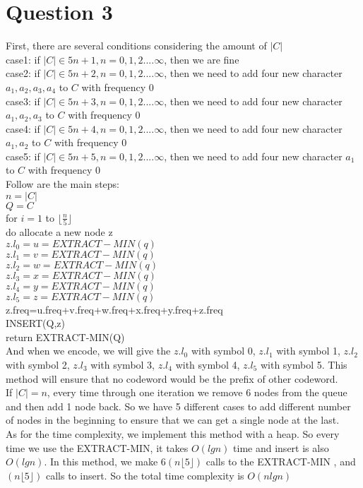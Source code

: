 \documentclass[paper=a4, fontsize=11pt]{scrartcl} %
\numberwithin{equation}{section} %
\numberwithin{figure}{section} %
\numberwithin{table}{section} %
\begin{document}
\section{\textbf{Question 3}}
First, there are several conditions considering the amount of $|C|$\\
case1: if $|C|\in{5n+1},n=0,1,2....\infty$, then we are fine\\
case2: if $|C|\in{5n+2},n=0,1,2....\infty$, then we need to add four new character $a_1,a_2,a_3,a_4$ to $C$ with frequency 0\\
case3: if $|C|\in{5n+3},n=0,1,2....\infty$, then we need to add four new character $a_1,a_2,a_3$ to $C$ with frequency 0\\
case4: if $|C|\in{5n+4},n=0,1,2....\infty$, then we need to add four new character $a_1,a_2$ to $C$ with frequency 0\\
case5: if $|C|\in{5n+5},n=0,1,2....\infty$, then we need to add four new character $a_1$ to $C$ with frequency 0\\
Follow are the main steps:\\
$n=|C|$\\
$Q=C$\\
for $i=1$ to $\biggl\lfloor\frac n 5\biggr\rfloor$\\
do allocate a new node z\\
$z.l_0=u=EXTRACT-MIN(q)$\\
$z.l_1=v=EXTRACT-MIN(q)$\\
$z.l_2=w=EXTRACT-MIN(q)$\\
$z.l_3=x=EXTRACT-MIN(q)$\\
$z.l_4=y=EXTRACT-MIN(q)$\\
$z.l_5=z=EXTRACT-MIN(q)$\\
z.freq=u.freq+v.freq+w.freq+x.freq+y.freq+z.freq\\
INSERT(Q,z)\\
return EXTRACT-MIN(Q)\\
And when we encode, we will give the $z.l_0$ with symbol 0, $z.l_1$ with symbol 1, $z.l_2$ with symbol 2, $z.l_3$ with symbol 3, $z.l_4$ with symbol 4, $z.l_5$ with symbol 5. This method will ensure that no codeword would be the prefix of other codeword.\\
If $|C|=n$, every time through one iteration we remove 6 nodes from the queue and then add 1 node back. So we have 5 different cases to add different number of nodes in the beginning to ensure that we can get a single node at the last.\\
As for the time complexity, we implement this method with a heap. So every time we use the EXTRACT-MIN, it takes $O(lgn)$ time and insert is also $O(lgn)$. In this method, we make $6(n\biggl\lfloor 5 \biggr\rfloor) $ calls to the EXTRACT-MIN , and  $(n\biggl\lfloor 5 \biggr\rfloor)$ calls to insert. So the total time complexity is $O(nlgn)$\\
\end{document}
